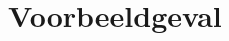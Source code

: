 \documentclass[12pt,a4paper]{article}
\begin{document}


\tableofcontents
\listoffigures
\listoftables
\listofalgorithms
\pagebreak


\pagestyle{fancy}







\appendix
\section{Voorbeeldgeval}
\begin{figure}[H]
   \centering
   
\end{figure}
\end{document}

